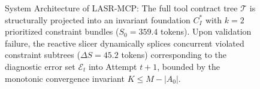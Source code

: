 \begin{figure}[t]
{%
}
\caption{System Architecture of LASR-MCP: The full tool contract tree $\mathcal{T}$ is structurally projected into an invariant foundation $C_I^*$ with $k=2$ prioritized constraint bundles ($S_0 = 359.4$ tokens). Upon validation failure, the reactive slicer dynamically splices concurrent violated constraint subtrees ($\Delta S = 45.2$ tokens) corresponding to the diagnostic error set $\mathcal{E}_t$ into Attempt $t+1$, bounded by the monotonic convergence invariant $K \le M - |A_0|$.}
\label{fig:system_architecture}
\end{figure}
